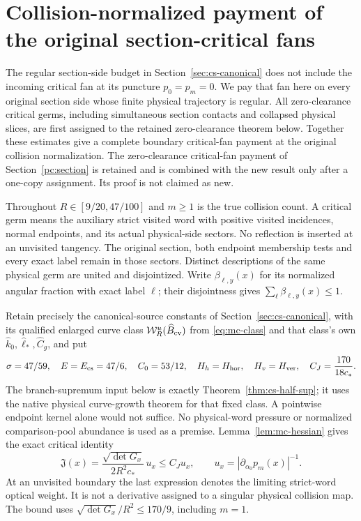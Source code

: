 \section{Collision-normalized payment of the original section-critical fans}
\label{sec:scf-section-critical}

The regular section-side budget in Section~\ref{sec:cs-canonical}
does not include the incoming critical fan at its puncture
$p_0=p_m=0$. We pay that fan here on every original section side
whose finite physical trajectory is regular. All zero-clearance
critical germs, including simultaneous section contacts and collapsed
physical slices, are first assigned to the retained zero-clearance
theorem below. Together these estimates give a complete boundary
critical-fan payment at the original collision normalization.
The zero-clearance critical-fan payment of Section~\ref{pc:section}
is retained and is combined with the new result only after a one-copy
assignment. Its proof is not claimed as new.

Throughout $R\in[9/20,47/100]$ and $m\ge1$ is the true collision
count. A critical germ means the auxiliary strict visited word
with positive visited incidences, normal endpoints, and its actual
physical-side sectors. No reflection is inserted at an unvisited
tangency. The original section, both endpoint membership tests and
every exact label remain in those sectors. Distinct descriptions of
the same physical germ are united and disjointized. Write
$\beta_{\ell,y}(x)$ for its normalized angular fraction with exact
label $\ell$; their disjointness gives
$\sum_\ell\beta_{\ell,y}(x)\le1$.

Retain precisely the canonical-source constants of
Section~\ref{sec:cs-canonical}, with its qualified enlarged curve
class $\mathcal W_R^u(\widehat B_{\rm cv})$ from
\eqref{eq:mc-class} and that class's own
$\widehat k_0,\widehat\ell_*,\widehat C_g$, and put
\begin{equation}\label{eq:scf-constants}
 \sigma=47/59,\quad E=E_{\rm cs}=47/6,\quad C_0=53/12,
 \quad H_h=H_{\rm hor},\quad H_v=H_{\rm ver},
 \quad C_J=\frac{170}{18c_*}.
\end{equation}
The branch-supremum input below is exactly
Theorem~\ref{thm:cs-half-sup}; it uses the native physical
curve-growth theorem for that fixed class. A pointwise endpoint
kernel alone would not suffice. No physical-word pressure or
normalized comparison-pool abundance is used as a premise.
Lemma~\ref{lem:mc-hessian} gives the exact critical identity
\begin{equation}\label{eq:scf-critical-optical}
 \mathfrak J(x)=\frac{\sqrt{\det G_x}}{2R^2c_*}\,u_x
       \le C_Ju_x,\qquad
 u_x=|\partial_{\alpha_0}p_m(x)|^{-1}.
\end{equation}
At an unvisited boundary the last expression denotes the limiting
strict-word optical weight. It is not a derivative assigned to a
singular physical collision map. The bound uses
$\sqrt{\det G_x}/R^2\le170/9$, including $m=1$.

